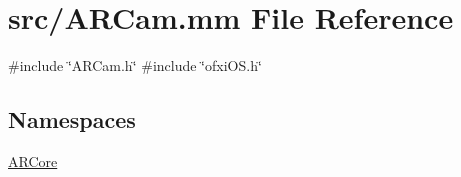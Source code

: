 \hypertarget{_a_r_cam_8mm}{}\section{src/\+A\+R\+Cam.mm File Reference}
\label{_a_r_cam_8mm}
{\ttfamily \#include \char`\"{}A\+R\+Cam.\+h\char`\"{}}\newline
{\ttfamily \#include \char`\"{}ofxi\+O\+S.\+h\char`\"{}}\newline
\subsection*{Namespaces}
\begin{DoxyCompactItemize}
\item 
 \hyperlink{namespace_a_r_core}{A\+R\+Core}
\end{DoxyCompactItemize}
